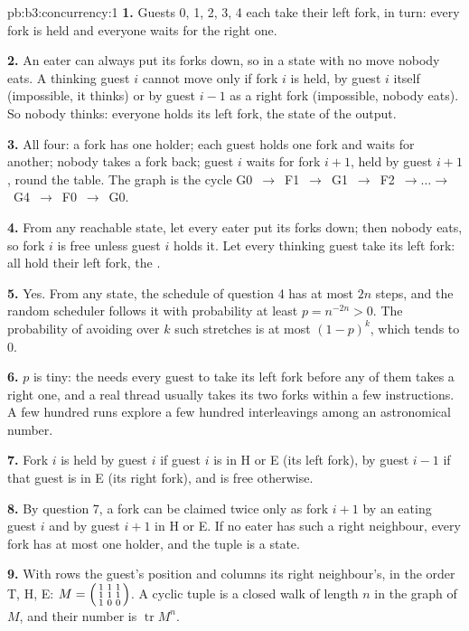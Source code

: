 \begin{solution}{pb:b3:concurrency:1}
\textbf{1.} Guests 0, 1, 2, 3, 4 each take their left fork, in turn: every fork is held and everyone waits for the right one.

\textbf{2.} An eater can always put its forks down, so in a state with no move nobody eats. A thinking guest $i$ cannot move only if fork $i$ is held, by guest $i$ itself (impossible, it thinks) or by guest $i - 1$ as a right fork (impossible, nobody eats). So nobody thinks: everyone holds its left fork, the state of the output.

\textbf{3.} All four: a fork has one holder; each guest holds one fork and waits for another; nobody takes a fork back; guest $i$ waits for fork $i + 1$, held by guest $i + 1$, round the table. The graph is the cycle G0~$\to$~F1~$\to$~G1~$\to$~F2~$\to \dots \to$~G4~$\to$~F0~$\to$~G0.

\textbf{4.} From any reachable state, let every eater put its forks down; then nobody eats, so fork $i$ is free unless guest $i$ holds it. Let every thinking guest take its left fork: all hold their left fork, the .

\textbf{5.} Yes. From any state, the schedule of question 4 has at most $2n$ steps, and the random scheduler follows it with probability at least $p = n^{-2n} > 0$. The probability of avoiding  over $k$ such stretches is at most $(1 - p)^k$, which tends to 0.

\textbf{6.} $p$ is tiny: the  needs every guest to take its left fork before any of them takes a right one, and a real thread usually takes its two forks within a few instructions. A few hundred runs explore a few hundred interleavings among an astronomical number.

\textbf{7.} Fork $i$ is held by guest $i$ if guest $i$ is in H or E (its left fork), by guest $i - 1$ if that guest is in E (its right fork), and is free otherwise.

\textbf{8.} By question 7, a fork can be claimed twice only as fork $i + 1$ by an eating guest $i$ and by guest $i + 1$ in H or E. If no eater has such a right neighbour, every fork has at most one holder, and the tuple is a state.

\textbf{9.} With rows the guest's position and columns its right neighbour's, in the order T, H, E: $M = \begin{psmallmatrix} 1 & 1 & 1 \\ 1 & 1 & 1 \\ 1 & 0 & 0 \end{psmallmatrix}$. A cyclic tuple is a closed walk of length $n$ in the graph of $M$, and their number is $\operatorname{tr} M^n$.


\end{solution}
